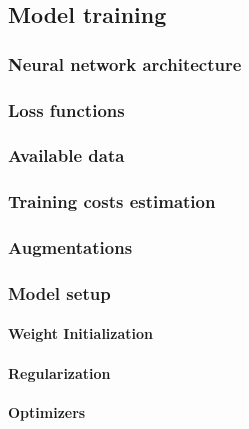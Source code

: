 \subsection{Model training}
    \subsubsection{Neural network architecture}
        
    \subsubsection{Loss functions}
        
    \subsubsection{Available data}
        
    \subsubsection{Training costs estimation}
        
    \subsubsection{Augmentations}
        
    \subsubsection{Model setup}
        \paragraph{Weight Initialization}
        
        \paragraph{Regularization}
        
        \paragraph{Optimizers}
        
